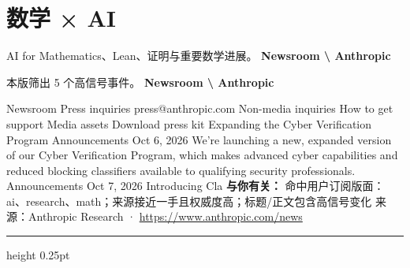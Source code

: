 \documentclass[10.5pt]{ctexart}
\begin{document}
\section*{数学 × AI}
{\color{ormuted} AI for Mathematics、Lean、证明与重要数学进展。}
\vspace{2mm}
{\LARGE\bfseries Newsroom \textbackslash{} Anthropic}\par
\vspace{1mm}
{\color{ormuted} 本版筛出 5 个高信号事件。}
\vspace{3mm}
{\Large\bfseries Newsroom \textbackslash{} Anthropic}\par
Newsroom Press inquiries press@anthropic.com Non-media inquiries How to get support Media assets Download press kit Expanding the Cyber Verification Program Announcements Oct 6, 2026 We’re launching a new, expanded version of our Cyber Verification Program, which makes advanced cyber capabilities and reduced blocking classifiers available to qualifying security professionals. Announcements Oct 7, 2026 Introducing Cla
\textbf{与你有关：} 命中用户订阅版面：ai、research、math；来源接近一手且权威度高；标题/正文包含高信号变化
{\footnotesize\color{ormuted} 来源：Anthropic Research · \url{https://www.anthropic.com/news}}
\vspace{4mm}
\hrule height 0.25pt
\vspace{3mm}
\end{document}
